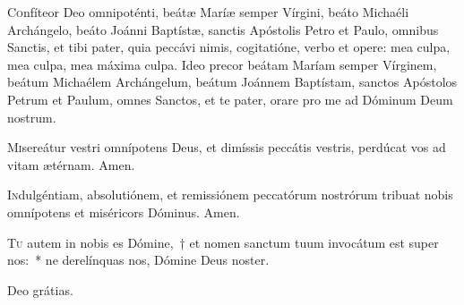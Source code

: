 \lettrine{C}{o}nfíteor Deo omnipoténti, beátæ Maríæ semper Vírgini, beáto Michaéli Archángelo, beáto Joánni Baptístæ, sanctis Apóstolis Petro et Paulo, omnibus Sanctis, et tibi pater, quia peccávi nimis, cogitatióne, verbo et opere: mea culpa, mea culpa, mea máxima culpa. Ideo precor beátam Maríam semper Vírginem, beátum Michaélem Archángelum, beátum Joánnem Baptístam, sanctos Apóstolos Petrum et Paulum, omnes Sanctos, et te pater, orare pro me ad Dóminum Deum nostrum.


\lettrine{M}{i}sereátur vestri omnípotens Deus, et dimíssis peccátis vestris, perdúcat vos ad vitam ætérnam. \rr Amen.

\lettrine{I}{n}dulgéntiam, \cc{} absolutiónem, et remissiónem peccatórum nostrórum tribuat nobis omnípotens et miséricors Dóminus.  \rr Amen.















\lettrine{T}{u} autem in nobis es Dómine,~† et nomen sanctum tuum invocátum est super nos:~* ne derelínquas nos, Dómine Deus noster.

\rr Deo grátias.

\respbrev


